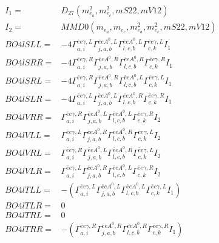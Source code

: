 \documentclass[A4,landscape]{article}
\begin{document}
\begin{align} 
I_1 = & D_{27}(m^2_{e_{{a}}}, m^2_{e_{{c}}}, mS22, mV12) \\ 
I_2 = & MMD0(m_{e_{{a}}}, m_{e_{{c}}}, m^2_{e_{{a}}}, m^2_{e_{{c}}}, mS22, mV12) \\ 
  BO4lSLL= & -4  \Gamma^{\bar{e}e \gamma ,L}_{a, i} \Gamma^{\bar{e}e A^0 ,L}_{j, a, b} \Gamma^{\bar{e}e A^0 ,L}_{l, c, b} \Gamma^{\bar{e}e \gamma ,L}_{c, k} I_1 \\ 
  BO4lSRR= & -4  \Gamma^{\bar{e}e \gamma ,R}_{a, i} \Gamma^{\bar{e}e A^0 ,R}_{j, a, b} \Gamma^{\bar{e}e A^0 ,R}_{l, c, b} \Gamma^{\bar{e}e \gamma ,R}_{c, k} I_1 \\ 
  BO4lSRL= & -4  \Gamma^{\bar{e}e \gamma ,R}_{a, i} \Gamma^{\bar{e}e A^0 ,R}_{j, a, b} \Gamma^{\bar{e}e A^0 ,L}_{l, c, b} \Gamma^{\bar{e}e \gamma ,L}_{c, k} I_1 \\ 
  BO4lSLR= & -4  \Gamma^{\bar{e}e \gamma ,L}_{a, i} \Gamma^{\bar{e}e A^0 ,L}_{j, a, b} \Gamma^{\bar{e}e A^0 ,R}_{l, c, b} \Gamma^{\bar{e}e \gamma ,R}_{c, k} I_1 \\ 
  BO4lVRR= &  \Gamma^{\bar{e}e \gamma ,R}_{a, i} \Gamma^{\bar{e}e A^0 ,L}_{j, a, b} \Gamma^{\bar{e}e A^0 ,L}_{l, c, b} \Gamma^{\bar{e}e \gamma ,R}_{c, k} I_2 \\ 
  BO4lVLL= &  \Gamma^{\bar{e}e \gamma ,L}_{a, i} \Gamma^{\bar{e}e A^0 ,R}_{j, a, b} \Gamma^{\bar{e}e A^0 ,R}_{l, c, b} \Gamma^{\bar{e}e \gamma ,L}_{c, k} I_2 \\ 
  BO4lVRL= &  \Gamma^{\bar{e}e \gamma ,R}_{a, i} \Gamma^{\bar{e}e A^0 ,L}_{j, a, b} \Gamma^{\bar{e}e A^0 ,R}_{l, c, b} \Gamma^{\bar{e}e \gamma ,L}_{c, k} I_2 \\ 
  BO4lVLR= &  \Gamma^{\bar{e}e \gamma ,L}_{a, i} \Gamma^{\bar{e}e A^0 ,R}_{j, a, b} \Gamma^{\bar{e}e A^0 ,L}_{l, c, b} \Gamma^{\bar{e}e \gamma ,R}_{c, k} I_2 \\ 
  BO4lTLL= & -( \Gamma^{\bar{e}e \gamma ,L}_{a, i} \Gamma^{\bar{e}e A^0 ,L}_{j, a, b} \Gamma^{\bar{e}e A^0 ,L}_{l, c, b} \Gamma^{\bar{e}e \gamma ,L}_{c, k} I_1) \\ 
  BO4lTLR= & 0 \\ 
  BO4lTRL= & 0 \\ 
  BO4lTRR= & -( \Gamma^{\bar{e}e \gamma ,R}_{a, i} \Gamma^{\bar{e}e A^0 ,R}_{j, a, b} \Gamma^{\bar{e}e A^0 ,R}_{l, c, b} \Gamma^{\bar{e}e \gamma ,R}_{c, k} I_1) \\ 
\end{align} 
\end{document}

